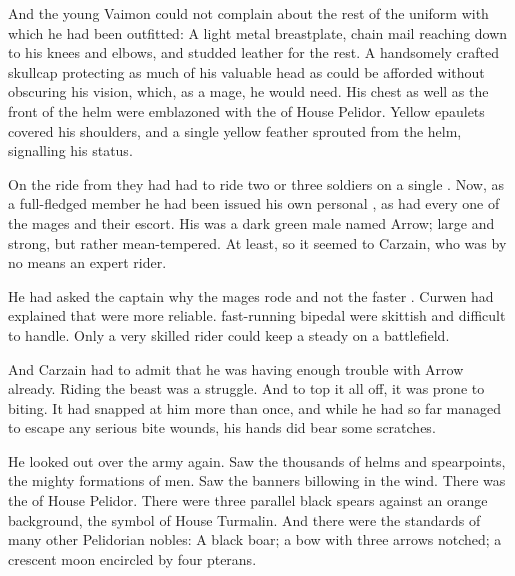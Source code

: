 \begin{garbage}

And the young Vaimon could not complain about the rest of the \ishrah{} uniform with which he had been outfitted: 
A light metal breastplate, chain mail reaching down to his knees and elbows, and studded leather for the rest. 
A handsomely crafted skullcap protecting as much of his valuable head as could be afforded without obscuring his vision, which, as a mage, he would need. 
His chest as well as the front of the helm were emblazoned with the \grulcan{} of House Pelidor. Yellow epaulets covered his shoulders, and a single yellow feather sprouted from the helm, signalling his \ishrah{} status. 

On the ride from \Redglen{} they had had to ride two or three soldiers on a single \relc. 
Now, as a full-fledged \ishrah{} member he had been issued his own personal \relc, as had every one of the mages and their escort. 
His was a dark green male named Arrow; large and strong, but rather mean-tempered. 
At least, so it seemed to Carzain, who was by no means an expert rider. 

He had asked the captain why the mages rode \relcs{} and not the faster \mikshas. 
Curwen had explained that \relcs{} were more reliable. 
\Mikshas{}\dash fast-running bipedal \saurians\dash were skittish and difficult to handle. 
Only a very skilled rider could keep a \miksha{} steady on a battlefield. 

And Carzain had to admit that he was having enough trouble with Arrow already. 
Riding the beast was a struggle. 
And to top it all off, it was prone to biting. 
It had snapped at him more than once, and while he had so far managed to escape any serious bite wounds, his hands did bear some scratches. 

He looked out over the army again. 
Saw the thousands of helms and spearpoints, the mighty formations of men. 
Saw the banners billowing in the wind. 
There was the \grulcan{} of House Pelidor. 
There were three parallel black spears against an orange background, the symbol of House Turmalin. 
And there were the standards of many other Pelidorian nobles: 
A black boar; 
a bow with three arrows notched; 
a crescent moon encircled by four pterans. 


\end{garbage}
